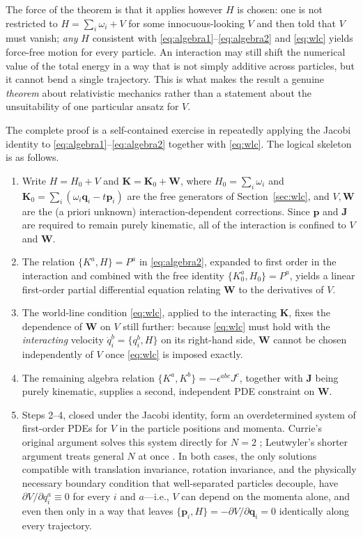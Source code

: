 The force of the theorem is that it applies however $H$ is chosen: one is not
restricted to $H=\sum_i\omega_i+V$ for some innocuous-looking $V$ and then told
that $V$ must vanish; \emph{any} $H$ consistent with
\eqref{eq:algebra1}--\eqref{eq:algebra2} and \eqref{eq:wlc} yields force-free
motion for every particle. An interaction may still shift the numerical value
of the total energy in a way that is not simply additive across particles, but
it cannot bend a single trajectory. This is what makes the result a genuine
\emph{theorem} about relativistic mechanics rather than a statement about the
unsuitability of one particular ansatz for $V$.


The complete proof  is a self-contained exercise in repeatedly applying the
Jacobi identity to \eqref{eq:algebra1}--\eqref{eq:algebra2} together with
\eqref{eq:wlc}.  The logical skeleton is as follows.

\begin{enumerate}
\item Write $H=H_0+V$ and ${\bm K}={\bm K}_0+{\bm W}$, where $H_0=\sum_i\omega_i$ and
    ${\bm K}_0=\sum_i(\omega_i{\bm q}_i-t{\bm p}_i)$ are the free generators of
        Section~\ref{sec:wlc}, and $V,{\bm W}$ are the (a priori unknown)
        interaction-dependent corrections. Since ${\bm p}$ and ${\bm J}$ are required
        to remain purely kinematic, all of the interaction is confined to $V$
        and ${\bm W}$.
\item The relation $\{K^a,H\}=P^a$ in \eqref{eq:algebra2}, expanded to first
    order in the interaction and combined with the free identity
        $\{K_0^a,H_0\}=P^a$, yields a linear first-order partial differential
        equation relating ${\bm W}$ to the derivatives of $V$.
\item The world-line condition \eqref{eq:wlc}, applied to the interacting
    ${\bm K}$, fixes the dependence of ${\bm W}$ on $V$ still further: because
        \eqref{eq:wlc} must hold with the \emph{interacting} velocity $\dot
        q_i^b=\{q_i^b,H\}$ on its right-hand side, ${\bm W}$ cannot be chosen
        independently of $V$ once \eqref{eq:wlc} is imposed exactly.
\item The remaining algebra relation $\{K^a,K^b\}=-\epsilon^{abc}J^c$,
    together with ${\bm J}$ being purely kinematic, supplies a second, independent
        PDE constraint on ${\bm W}$.
\item Steps 2--4, closed under the Jacobi identity, form an overdetermined
    system of first-order PDEs for $V$ in the particle positions and momenta.
        Currie's original argument solves this system directly for $N=2$
        ; Leutwyler's shorter argument treats general $N$ at
        once \cite{Leutwyler1965}. In both cases, the only solutions compatible
        with translation invariance, rotation invariance, and the physically
        necessary boundary condition that well-separated particles decouple,
        have $\partial V/\partial q_i^a\equiv 0$ for every $i$ and $a$---i.e.,
        $V$ can depend on the momenta alone, and even then only in a way that
        leaves $\{{\bm p}_i,H\}=-\partial V/\partial{\bm q}_i=0$ identically along
        every trajectory.
\end{enumerate}

